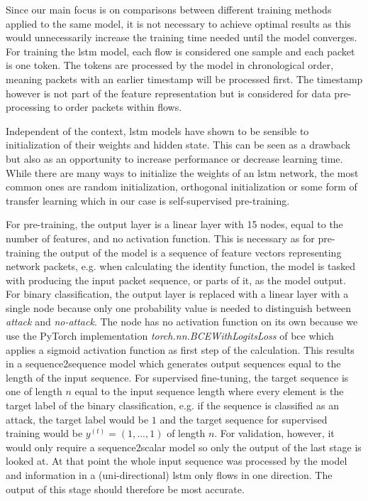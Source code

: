 Since our main focus is on comparisons between different training methods applied to the same model, it is not necessary to achieve optimal results as this would unnecessarily increase the training time needed until the model converges. For training the \gls{lstm} model, each flow is considered one sample and each packet is one token. The tokens are processed by the model in chronological order, meaning packets with an earlier timestamp will be processed first. The timestamp however is not part of the feature representation but is considered for data pre-processing to order packets within flows. \par
Independent of the context, \gls{lstm} models have shown to be sensible to initialization of their weights and hidden state. This can be seen as a drawback but also as an opportunity to increase performance or decrease learning time. While there are many ways to initialize the weights of an \gls{lstm} network, the most common ones are random initialization, orthogonal initialization or some form of transfer learning which in our case is self-supervised pre-training. \par
For pre-training, the output layer is a linear layer with 15 nodes, equal to the number of features, and no activation function. This is necessary as for pre-training the output of the model is a sequence of feature vectors representing network packets, e.g. when calculating the identity function, the model is tasked with producing the input packet sequence, or parts of it, as the model output. For binary classification, the output layer is replaced with a linear layer with a single node because only one probability value is needed to distinguish between \textit{attack} and \textit{no-attack}. The node has no activation function on its own because we use the PyTorch implementation \textit{torch.nn.BCEWithLogitsLoss} of \gls{bce} which applies a sigmoid activation function as first step of the calculation. This results in a sequence2sequence model which generates output sequences equal to the length of the input sequence. For supervised fine-tuning, the target sequence is one of length $n$ equal to the input sequence length where every element is the target label of the binary classification, e.g. if the sequence is classified as an attack, the target label would be $1$ and the target sequence for supervised training would be $y^{(t)} = (1,...,1)$ of length $n$. For validation, however, it would only require a sequence2scalar model so only the output of the last stage is looked at. At that point the whole input sequence was processed by the model and information in a (uni-directional) \gls{lstm} only flows in one direction. The output of this stage should therefore be most accurate.

